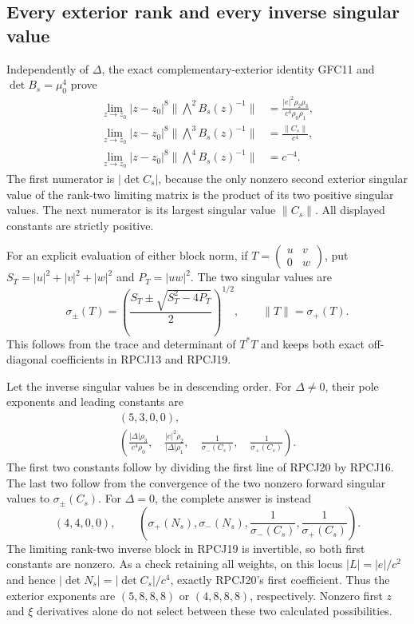 \subsection{Every exterior rank and every inverse singular value}
Independently of $\Delta$, the exact complementary-exterior identity
GFC11 and $\det B_s=\mu_0^4$ prove
\[
 \begin{split}
 \lim_{z\to z_0}|z-z_0|^8\|\bigwedge^2B_s(z)^{-1}\|
   &=\frac{|e|^2\rho_2\rho_3}{c^4\rho_0\rho_1},\\
 \lim_{z\to z_0}|z-z_0|^8\|\bigwedge^3B_s(z)^{-1}\|
   &=\frac{\|C_s\|}{c^4},\\
 \lim_{z\to z_0}|z-z_0|^8\|\bigwedge^4B_s(z)^{-1}\|
   &=c^{-4}.
 \end{split}\tag{RPCJ20}
\]
The first numerator is $|\det C_s|$, because the only nonzero
second exterior singular value of the rank-two limiting matrix is
the product of its two positive singular values. The next numerator
is its largest singular value $\|C_s\|$.
All displayed constants are strictly positive.

For an explicit evaluation of either block norm, if
$T=\left(\begin{smallmatrix}u&v\\0&w\end{smallmatrix}\right)$,
put $S_T=|u|^2+|v|^2+|w|^2$ and $P_T=|uw|^2$.
The two singular values are
\[
 \sigma_\pm(T)=
 \left(\frac{S_T\pm\sqrt{S_T^2-4P_T}}2\right)^{1/2},
 \qquad\|T\|=\sigma_+(T).
 \tag{RPCJ21}
\]
This follows from the trace and determinant of $T^*T$ and keeps
both exact off-diagonal coefficients in RPCJ13 and RPCJ19.

Let the inverse singular values be in descending order.
For $\Delta\ne0$, their pole exponents and leading constants are
\[
 \begin{gathered}
       (5,3,0,0),\\
 \left(
 \frac{|\Delta|\rho_3}{c^4\rho_0},\quad
 \frac{|e|^2\rho_2}{|\Delta|\rho_1},\quad
 \frac1{\sigma_-(C_s)},\quad\frac1{\sigma_+(C_s)}
 \right).
 \end{gathered}\tag{RPCJ22}
\]
The first two constants follow by dividing the first line of RPCJ20
by RPCJ16. The last two follow from the convergence of the two
nonzero forward singular values to $\sigma_\pm(C_s)$.
For $\Delta=0$, the complete answer is instead
\[
       (4,4,0,0),\qquad
 \left(\sigma_+(N_s),\sigma_-(N_s),
       \frac1{\sigma_-(C_s)},\frac1{\sigma_+(C_s)}\right).
 \tag{RPCJ23}
\]
The limiting rank-two inverse block in RPCJ19 is invertible, so both
first constants are nonzero. As a check retaining all weights,
on this locus $|L|=|e|/c^2$ and hence
$|\det N_s|=|\det C_s|/c^4$, exactly RPCJ20's first coefficient.
Thus the exterior exponents are $(5,8,8,8)$ or $(4,8,8,8)$,
respectively. Nonzero first $z$ and $\xi$ derivatives alone do not
select between these two calculated possibilities.

